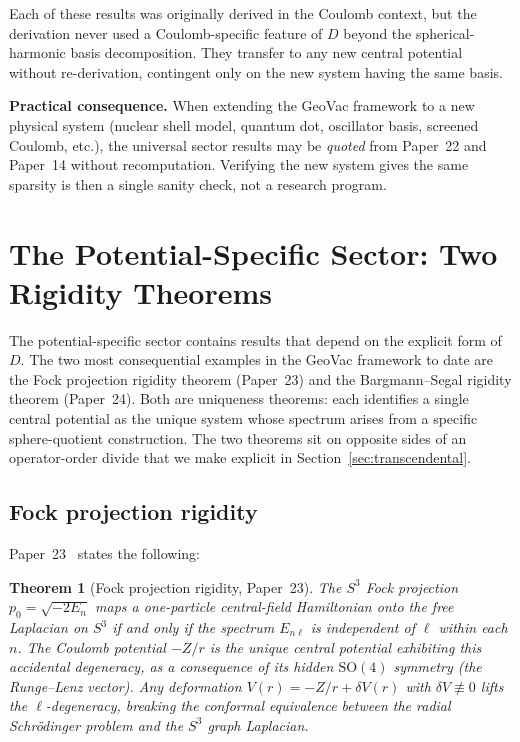 \documentclass[twocolumn,pra,amsmath,amssymb,superscriptaddress]{revtex4-2}
\newtheorem{theorem}{Theorem}
\begin{document}
Each of these results was originally derived in the Coulomb context,
but the derivation never used a Coulomb-specific feature of $D$
beyond the spherical-harmonic basis decomposition.  They transfer to
any new central potential without re-derivation, contingent only on
the new system having the same basis.

\medskip\noindent\textbf{Practical consequence.}  When extending the
GeoVac framework to a new physical system (nuclear shell model,
quantum dot, oscillator basis, screened Coulomb, etc.), the universal
sector results may be \emph{quoted} from Paper~22 and Paper~14
without recomputation.  Verifying the new system gives the same
sparsity is then a single sanity check, not a research program.

\section{The Potential-Specific Sector: Two Rigidity Theorems}
\label{sec:specific}

The potential-specific sector contains results that depend on the
explicit form of $D$.  The two most consequential examples in the
GeoVac framework to date are the Fock projection rigidity theorem
(Paper~23) and the Bargmann--Segal rigidity theorem (Paper~24).
Both are uniqueness theorems: each identifies a single central
potential as the unique system whose spectrum arises from a specific
sphere-quotient construction.  The two theorems sit on opposite
sides of an operator-order divide that we make explicit in
Section~\ref{sec:transcendental}.

\subsection{Fock projection rigidity}
\label{sec:fock_rigidity}

Paper~23~\cite{paper23} states the following:

\begin{theorem}[Fock projection rigidity, Paper~23]
\label{thm:fock_rigidity}
The $S^3$ Fock projection $p_0 = \sqrt{-2 E_n}$ maps a one-particle
central-field Hamiltonian onto the free Laplacian on $S^3$ if and
only if the spectrum $E_{n\ell}$ is independent of $\ell$ within
each $n$.  The Coulomb potential $-Z/r$ is the unique central
potential exhibiting this accidental degeneracy, as a consequence of
its hidden $\mathrm{SO}(4)$ symmetry (the Runge--Lenz vector).  Any
deformation $V(r) = -Z/r + \delta V(r)$ with $\delta V \not\equiv 0$
lifts the $\ell$-degeneracy, breaking the conformal equivalence
between the radial Schr\"odinger problem and the $S^3$ graph
Laplacian.
\end{theorem}
\end{document}
